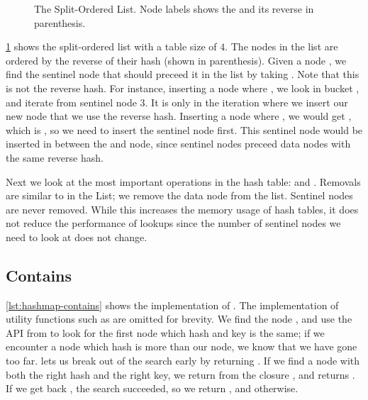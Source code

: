 \begin{figure}[ht]
\centering

\caption{The Split-Ordered List. Node labels shows the  and its reverse in
parenthesis.\label{fig:split-order-list}}
\end{figure}

\cref{fig:split-order-list} shows the split-ordered list with a table size of $4$. The nodes in the
list are ordered by the reverse of their hash (shown in parenthesis). Given a node , we
find the sentinel node that should preceed it in the list by taking .
Note that this is not the reverse hash. For instance, inserting a node where ,
we look in bucket , and iterate from sentinel node 3. It is only in the iteration
where we insert our new node that we use the reverse hash.  Inserting a node where , we would get , which is , so we need to insert the sentinel node
first. This sentinel node would be inserted in between the  and  node, since
sentinel nodes preceed data nodes with the same reverse hash.

Next we look at the most important operations in the hash table:  and .
Removals are similar to in the List; we remove the data node from the list. Sentinel nodes are
never removed. While this increases the memory usage of hash tables, it does not reduce the
performance of lookups since the number of sentinel nodes we need to look at does not change.

\subsection{Contains}

\cref{lst:hashmap-contains} shows the implementation of . The
implementation of utility functions such as  are omitted for brevity.  We
find the  node , and use the  API from 
 to look for the first node which hash and key is the same; if we encounter a node
which hash is more than our node, we know that we have gone too far. 
lets us break out of the search early by returning  . If we find a node
with both the right hash and the right key, we return  from the
closure , and  returns . If we get back , the
search succeeded, so we return , and  otherwise.



